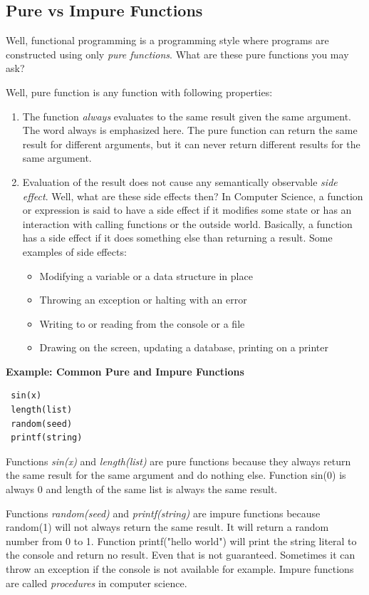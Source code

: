 \documentclass[12pt,twoside,a4paper]{report}
\begin{document}
\subsection{Pure vs Impure Functions}\label{A.4}
Well, functional programming is a programming style where programs are constructed using only \emph{pure functions}. What are these pure functions you may ask? 

Well, pure function is any function with following properties:
\begin{enumerate}
\item The function \emph{always} evaluates to the same result given the same argument. The word always is emphasized here. The pure function can return the same result for different arguments, but it can never return different results for the same argument.
\item Evaluation of the result does not cause any semantically observable \emph{side effect}. Well, what are these side effects then? In Computer Science, a function or expression is said to have a side effect if it modifies some state or has an interaction with calling functions or the outside world. Basically, a function has a side effect if it does something else than returning a result. Some examples of side effects:
\begin{itemize}
\item Modifying a variable or a data structure in place
\item Throwing an exception or halting with an error
\item Writing to or reading from the console or a file
\item Drawing on the screen, updating a database, printing on a printer
\end{itemize}
\end{enumerate}

\textbf{Example: Common Pure and Impure Functions}

\begin{lstlisting}
 sin(x)
 length(list)
 random(seed)
 printf(string)
\end{lstlisting}

Functions \emph{sin(x)} and \emph{length(list)} are pure functions because they always return the same result for the same argument and do nothing else. Function sin(0) is always 0 and length of the same list is always the same result.\par
Functions \emph{random(seed)} and \emph{printf(string)} are impure functions because random(1) will not always return the same result. It will return a random number from 0 to 1. Function printf("hello world") will print the string literal to the console and return no result. Even that is not guaranteed. Sometimes it can throw an exception if the console is not available for example. Impure functions are called \emph{procedures} in computer science.
\end{document}

